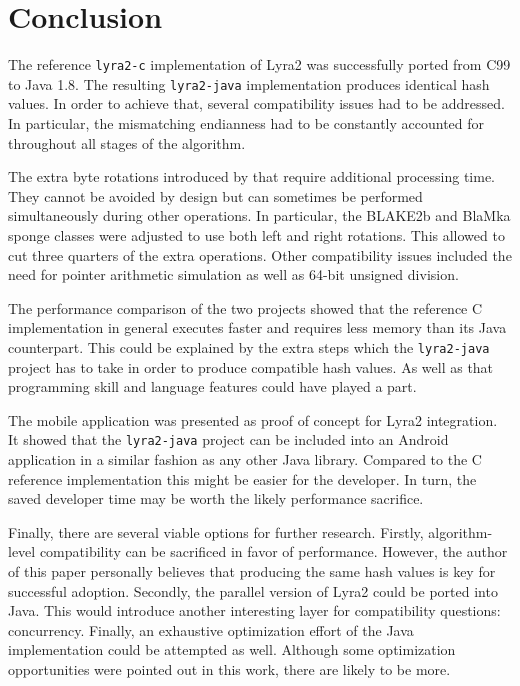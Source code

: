 \chapter{Conclusion}
\label{sec:conclusion}

The reference \texttt{lyra2-c} implementation of Lyra2 was successfully ported from C99 to Java 1.8. The resulting \texttt{lyra2-java} implementation produces identical hash values. In order to achieve that, several compatibility issues had to be addressed. In particular, the mismatching endianness had to be constantly accounted for throughout all stages of the algorithm.

The extra byte rotations introduced by that require additional processing time. They cannot be avoided by design but can sometimes be performed simultaneously during other operations. In particular, the BLAKE2b and BlaMka sponge classes were adjusted to use both left and right rotations. This allowed to cut three quarters of the extra operations. Other compatibility issues included the need for pointer arithmetic simulation as well as 64-bit unsigned division.

The performance comparison of the two projects showed that the reference C implementation in general executes faster and requires less memory than its Java counterpart. This could be explained by the extra steps which the \texttt{lyra2-java} project has to take in order to produce compatible hash values. As well as that programming skill and language features could have played a part.

The mobile application was presented as proof of concept for Lyra2 integration. It showed that the \texttt{lyra2-java} project can be included into an Android application in a similar fashion as any other Java library. Compared to the C reference implementation this might be easier for the developer. In turn, the saved developer time may be worth the likely performance sacrifice.

Finally, there are several viable options for further research. Firstly, algorithm-level compatibility can be sacrificed in favor of performance. However, the author of this paper personally believes that producing the same hash values is key for successful adoption. Secondly, the parallel version of Lyra2 could be ported into Java. This would introduce another interesting layer for compatibility questions: concurrency. Finally, an exhaustive optimization effort of the Java implementation could be attempted as well. Although some optimization opportunities were pointed out in this work, there are likely to be more.
